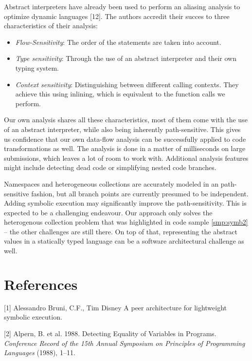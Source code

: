 \documentclass[a4paper, 16pt, oneside]{Thesis}
\providecommand{\tightlist}{%
  \setlength{\itemsep}{0pt}\setlength{\parskip}{0pt}}
\renewcommand{\hypertarget}[2]{\leavevmode\oldhypertarget{#1}{#2}}
\begin{document}
Abstract interpreters have already been used to perform an aliasing
analysis to optimize dynamic languages {[}12{]}. The authors accredit
their succes to three characteristics of their analysis:

\begin{itemize}
\tightlist
\item
  \textit{Flow-Sensitivity}: The order of the statements are taken into
  account.
\item
  \textit{Type sensitivity}: Through the use of an abstract interpreter
  and their own typing system.
\item
  \textit{Context sensitivity}: Distinguishing between different calling
  contexts. They achieve this using inlining, which is equivalent to the
  function calls we perform.
\end{itemize}

Our own analysis shares all these characteristics, most of them come
with the use of an abstract interpreter, while also being inherently
path-sensitive. This gives us confidence that our own data-flow analysis
can be successfully applied to code transformations as well. The
analysis is done in a matter of milliseconds on large submissions, which
leaves a lot of room to work with. Additional analysis features might
include detecting dead code or simplifying nested code branches.

Namespaces and heterogeneous collections are accurately modeled in an
path-sensitive fashion, but all branch points are currently presumed to
be independent. Adding symbolic execution may significantly improve the
path-sensitivity. This is expected to be a challenging endeavour. Our
approach only solves the heterogenous collection problem that was
highlighted in code sample \ref{smp:symb2} -- the other challenges are
still there. On top of that, representing the abstract values in a
statically typed language can be a software architectural challenge as
well.

\chapter*{References}\label{references}

\hypertarget{refs}{}
\hypertarget{ref-symbex2}{}
{[}1{]} Alessandro Bruni, C.F., Tim Disney A peer architecture for
lightweight symbolic execution.

\hypertarget{ref-equality}{}
{[}2{]} Alpern, B. et al. 1988. Detecting Equality of Variables in
Programs. \emph{Conference Record of the 15th Annual Symposium on
Principles of Programming Languages} (1988), 1--11.
\end{document}
